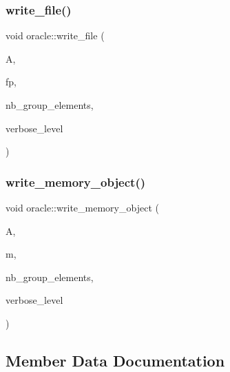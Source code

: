 \mbox{\label{classoracle_af69a81f09a0590a7d75e97126d481ceb}} 
\subsubsection{\texorpdfstring{write\+\_\+file()}{write\_file()}}
{\footnotesize\ttfamily void oracle\+::write\+\_\+file (\begin{DoxyParamCaption}\item[{\mbox{\hyperlink{classaction}{action}} $\ast$}]{A,  }\item[{F\+I\+LE $\ast$}]{fp,  }\item[{\mbox{\hyperlink{galois_8h_a09fddde158a3a20bd2dcadb609de11dc}{I\+NT}} \&}]{nb\+\_\+group\+\_\+elements,  }\item[{\mbox{\hyperlink{galois_8h_a09fddde158a3a20bd2dcadb609de11dc}{I\+NT}}}]{verbose\+\_\+level }\end{DoxyParamCaption})}

\mbox{\label{classoracle_a5d3200ed92f7075452876de4a9af3f99}} 
\subsubsection{\texorpdfstring{write\+\_\+memory\+\_\+object()}{write\_memory\_object()}}
{\footnotesize\ttfamily void oracle\+::write\+\_\+memory\+\_\+object (\begin{DoxyParamCaption}\item[{\mbox{\hyperlink{classaction}{action}} $\ast$}]{A,  }\item[{\mbox{\hyperlink{classmemory__object}{memory\+\_\+object}} $\ast$}]{m,  }\item[{\mbox{\hyperlink{galois_8h_a09fddde158a3a20bd2dcadb609de11dc}{I\+NT}} \&}]{nb\+\_\+group\+\_\+elements,  }\item[{\mbox{\hyperlink{galois_8h_a09fddde158a3a20bd2dcadb609de11dc}{I\+NT}}}]{verbose\+\_\+level }\end{DoxyParamCaption})}



\subsection{Member Data Documentation}
\mbox{\label{classoracle_a2b1e31455effcbf5679e646fe79b02bc}} 
